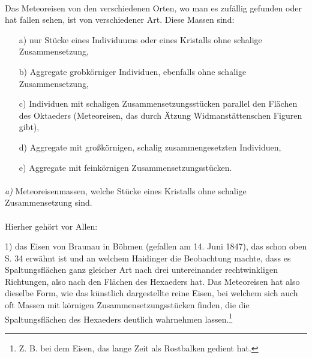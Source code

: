 \documentclass[a4paper, 11pt, oneside]{article}
\begin{document}
\paragraph{}
Das Meteoreisen von den verschiedenen Orten, wo man es zufällig gefunden oder hat fallen sehen, ist von verschiedener Art. Diese Massen sind:
\begin{itemize}
  \item[a)] nur Stücke eines Individuums oder eines Kristalls ohne schalige Zusammensetzung,
  \item[b)] Aggregate grobkörniger Individuen, ebenfalls ohne schalige Zusammensetzung,
  \item[c)] Individuen mit schaligen Zusammensetzungsstücken parallel den Flächen des Oktaeders (Meteoreisen, das durch Ätzung Widmanstättenschen Figuren gibt),
  \item[d)] Aggregate mit großkörnigen, schalig zusammengesetzten Individuen,
  \item[e)] Aggregate mit feinkörnigen Zusammensetzungsstücken.
\end{itemize}
\paragraph{}
\emph{a)} Meteoreisenmassen, welche Stücke eines Kristalls ohne schalige Zusammensetzung sind.
\vspace{\medskipamount}
\paragraph{}
Hierher gehört vor Allen:

1) das Eisen von Braunau in Böhmen (gefallen am 14. Juni 1847), das schon oben S. 34 erwähnt ist und an welchem Haidinger die Beobachtung machte, dass es Spaltungsflächen ganz gleicher Art nach drei untereinander rechtwinkligen Richtungen, also nach den Flächen des Hexaeders hat. Das Meteoreisen hat also dieselbe Form, wie das künstlich dargestellte reine Eisen, bei welchem sich auch oft Massen mit körnigen Zusammensetzungsstücken finden, die die Spaltungsflächen des Hexaeders deutlich wahrnehmen lassen.\footnote{Z. B. bei dem Eisen, das lange Zeit als Rostbalken gedient hat.}
\end{document}
